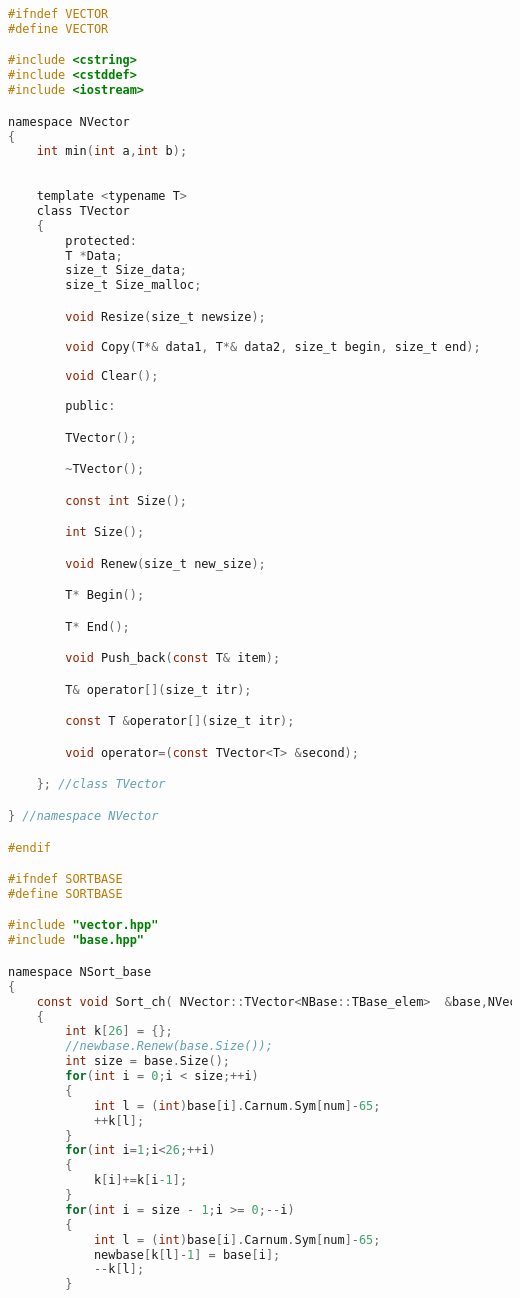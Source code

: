 \begin{lstlisting}[language=C]
#ifndef VECTOR
#define VECTOR

#include <cstring>
#include <cstddef>
#include <iostream>

namespace NVector
{
    int min(int a,int b);
    
    
    template <typename T>
    class TVector
    {
        protected:
        T *Data;
        size_t Size_data;
        size_t Size_malloc;

        void Resize(size_t newsize);
        
        void Copy(T*& data1, T*& data2, size_t begin, size_t end);
    
        void Clear();
        
        public:

        TVector();

        ~TVector();

        const int Size();

        int Size();

        void Renew(size_t new_size);

        T* Begin();

        T* End();

        void Push_back(const T& item);

        T& operator[](size_t itr);

        const T &operator[](size_t itr);

        void operator=(const TVector<T> &second); 

    }; //class TVector

} //namespace NVector

#endif

#ifndef SORTBASE
#define SORTBASE

#include "vector.hpp"
#include "base.hpp"

namespace NSort_base
{
    const void Sort_ch( NVector::TVector<NBase::TBase_elem>  &base,NVector::TVector<NBase::TBase_elem> &newbase, int num)
    {
        int k[26] = {};
        //newbase.Renew(base.Size());
        int size = base.Size();
        for(int i = 0;i < size;++i)
        {
            int l = (int)base[i].Carnum.Sym[num]-65;
            ++k[l];
        }
        for(int i=1;i<26;++i)
        {
            k[i]+=k[i-1];
        }
        for(int i = size - 1;i >= 0;--i)
        {
            int l = (int)base[i].Carnum.Sym[num]-65;
            newbase[k[l]-1] = base[i];
            --k[l];
        }


\end{lstlisting}
